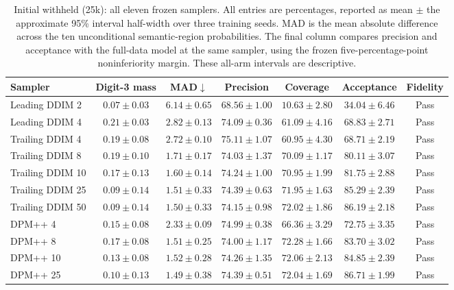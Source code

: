 \begin{table}[t]
\centering\footnotesize
\setlength{\tabcolsep}{3.5pt}
\caption{Initial withheld (25k): all eleven frozen samplers. All entries are percentages, reported as mean $\pm$ the approximate 95\% interval half-width over three training seeds. MAD is the mean absolute difference across the ten unconditional semantic-region probabilities. The final column compares precision and acceptance with the full-data model at the same sampler, using the frozen five-percentage-point noninferiority margin. These all-arm intervals are descriptive.}
\label{tab:mnist_all_withheld}
\begin{tabular}{lcccccc}
\toprule
Sampler & Digit-3 mass & MAD$\downarrow$ & Precision & Coverage & Acceptance & Fidelity \\
\midrule
Leading DDIM 2 & $0.07\pm0.03$ & $6.14\pm0.65$ & $68.56\pm1.00$ & $10.63\pm2.80$ & $34.04\pm6.46$ & Pass \\
Leading DDIM 4 & $0.21\pm0.03$ & $2.82\pm0.13$ & $74.09\pm0.36$ & $61.09\pm4.16$ & $68.83\pm2.71$ & Pass \\
Trailing DDIM 4 & $0.19\pm0.08$ & $2.72\pm0.10$ & $75.11\pm1.07$ & $60.95\pm4.30$ & $68.71\pm2.19$ & Pass \\
Trailing DDIM 8 & $0.19\pm0.10$ & $1.71\pm0.17$ & $74.03\pm1.37$ & $70.09\pm1.17$ & $80.11\pm3.07$ & Pass \\
Trailing DDIM 10 & $0.17\pm0.13$ & $1.60\pm0.14$ & $74.24\pm1.00$ & $70.95\pm1.99$ & $81.75\pm2.88$ & Pass \\
Trailing DDIM 25 & $0.09\pm0.14$ & $1.51\pm0.33$ & $74.39\pm0.63$ & $71.95\pm1.63$ & $85.29\pm2.39$ & Pass \\
Trailing DDIM 50 & $0.09\pm0.14$ & $1.50\pm0.33$ & $74.15\pm0.98$ & $72.02\pm1.86$ & $86.19\pm2.18$ & Pass \\
DPM++ 4 & $0.15\pm0.08$ & $2.33\pm0.09$ & $74.99\pm0.38$ & $66.36\pm3.29$ & $72.75\pm3.35$ & Pass \\
DPM++ 8 & $0.17\pm0.08$ & $1.51\pm0.25$ & $74.00\pm1.17$ & $72.28\pm1.66$ & $83.70\pm3.02$ & Pass \\
DPM++ 10 & $0.13\pm0.08$ & $1.52\pm0.28$ & $74.26\pm1.35$ & $72.06\pm2.13$ & $84.85\pm2.39$ & Pass \\
DPM++ 25 & $0.10\pm0.13$ & $1.49\pm0.38$ & $74.39\pm0.51$ & $72.04\pm1.69$ & $86.71\pm1.99$ & Pass \\
\bottomrule
\end{tabular}
\end{table}

